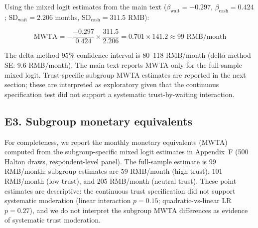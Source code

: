 Using the mixed logit estimates from the main text ($\beta_{\text{wait}} = -0.297$, $\beta_{\text{cash}} = 0.424$; $\text{SD}_{\text{wait}} = 2.206$ months, $\text{SD}_{\text{cash}} = 311.5$ RMB):

\[
\text{MWTA} = -\frac{-0.297}{0.424} \times \frac{311.5}{2.206} = 0.701 \times 141.2 \approx 99 \text{ RMB/month}
\]

The delta-method 95\% confidence interval is 80--118 RMB/month (delta-method SE: 9.6 RMB/month). The main text reports MWTA only for the full-sample mixed logit. Trust-specific subgroup MWTA estimates are reported in the next section; these are interpreted as exploratory given that the continuous specification test did not support a systematic trust-by-waiting interaction.

\subsection*{E3. Subgroup monetary equivalents}

For completeness, we report the monthly monetary equivalents (MWTA) computed from the subgroup-specific mixed logit estimates in Appendix~F (500 Halton draws, respondent-level panel). The full-sample estimate is 99 RMB/month; subgroup estimates are 59 RMB/month (high trust), 101 RMB/month (low trust), and 205 RMB/month (neutral trust). These point estimates are descriptive: the continuous trust specification did not support systematic moderation (linear interaction $p = 0.15$; quadratic-vs-linear LR $p = 0.27$), and we do not interpret the subgroup MWTA differences as evidence of systematic trust moderation.

\clearpage
